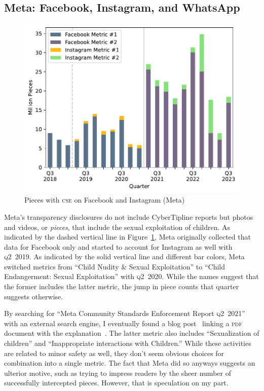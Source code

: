 \documentclass[nonacm,screen]{acmart}
\newcommand\V[1]{\textsc{\MakeLowercase{#1}}}
\begin{document}
\subsection{Meta: Facebook, Instagram, and WhatsApp}

\begin{figure}
\centering\libertineLF
\includegraphics[scale=0.6]{figure/fb-insta-pieces}
\caption{Pieces with \V{CSE} on Facebook and Instagram (Meta)}
\label{fig:meta-pieces}
\end{figure}

Meta's transparency disclosures do not include CyberTipline reports but photos
and videos, or \emph{pieces}, that include the sexual exploitation of children.
As indicated by the dashed vertical line in Figure~\ref{fig:meta-pieces}, Meta
originally collected that data for Facebook only and started to account for
Instagram as well with \V{Q2}~2019. As indicated by the solid vertical line and
different bar colors, Meta switched metrics from ``Child Nudity \& Sexual
Exploitation'' to ``Child Endangerment: Sexual Exploitation'' with \V{Q2}~2020.
While the names suggest that the former includes the latter metric, the jump in
piece counts that quarter suggests otherwise.

By searching for ``Meta Community Standards Enforcement Report \V{\V{Q2}}~2021''
with an external search engine, I eventually found a blog
post~\cite{Facebook2021a} linking a \V{PDF} document with the
explanation~\cite{Facebook2021}. The latter metric also includes ``Sexualization
of children'' and ``Inappropriate interactions with Children.'' While these
activities are related to minor safety as well, they don't seem obvious choices
for combination into a single metric. The fact that Meta did so anyways suggests
an ulterior motive, such as trying to impress readers by the sheer number of
successfully intercepted pieces. However, that is speculation on my part.
\end{document}
